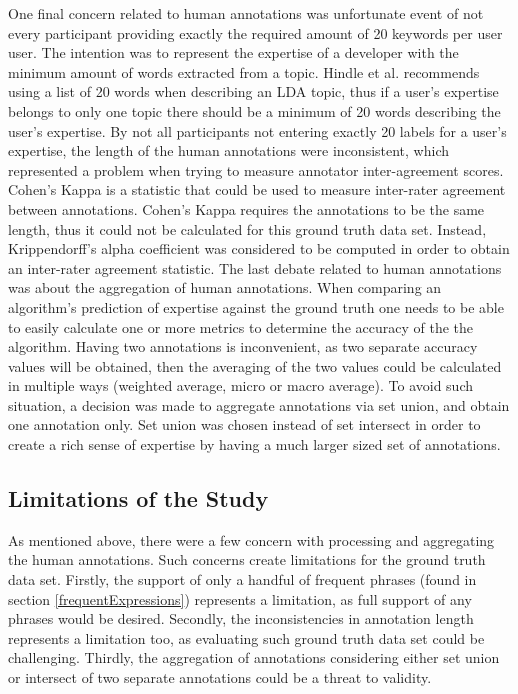             One final concern related to human annotations was unfortunate event of not every participant providing exactly the required amount of 20 keywords per user user. The intention was to represent the expertise of a developer with the minimum amount of words extracted from a topic. Hindle et al. \cite{hindle2012relating} recommends using a list of 20 words when describing an LDA topic, thus if a user's expertise belongs to only one topic there should be a minimum of 20 words describing the user's expertise. By not all participants not entering exactly 20 labels for a user's expertise, the length of the human annotations were inconsistent, which represented a problem when trying to measure annotator inter-agreement scores. Cohen's Kappa is a statistic that could be used to measure inter-rater agreement between annotations. Cohen's Kappa requires the annotations to be the same length, thus it could not be calculated for this ground truth data set. Instead, Krippendorff's alpha coefficient was considered to be computed in order to obtain an inter-rater agreement statistic. The last debate related to human annotations was about the aggregation of human annotations. When comparing an algorithm's prediction of expertise against the ground truth one needs to be able to easily calculate one or more metrics to determine the accuracy of the the algorithm. Having two annotations is inconvenient, as two separate accuracy values will be obtained, then the averaging of the two values could be calculated in multiple ways (weighted average, micro or macro average). To avoid such situation, a decision was made to aggregate annotations via set union, and obtain one annotation only. Set union was chosen instead of set intersect in order to create a rich sense of expertise by having a much larger sized set of annotations.
        
        \subsection{Limitations of the Study}
            As mentioned above, there were a few concern with processing and aggregating the human annotations. Such concerns create limitations for the ground truth data set. Firstly, the support of only a handful of frequent phrases (found in section \ref{frequentExpressions}) represents a limitation, as full support of any phrases would be desired. Secondly, the inconsistencies in annotation length represents a limitation too, as evaluating such ground truth data set could be challenging. Thirdly, the aggregation of annotations considering either set union or intersect of two separate annotations could be a threat to validity. 
        
